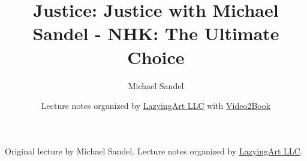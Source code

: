 \documentclass[11pt,oneside]{book}
\begin{document}
\frontmatter
\title{Justice: Justice with Michael Sandel - NHK: The Ultimate Choice}
\author{Michael Sandel}
\date{Lecture notes organized by \href{https://lazying.art}{LazyingArt LLC} with \href{https://github.com/lachlanchen/Video2Book}{Video2Book}}
\maketitle
\begin{center}
\small Original lecture by Michael Sandel. Lecture notes organized by \href{https://lazying.art}{LazyingArt LLC}.
\end{center}
\clearpage
\mainmatter

\end{document}
